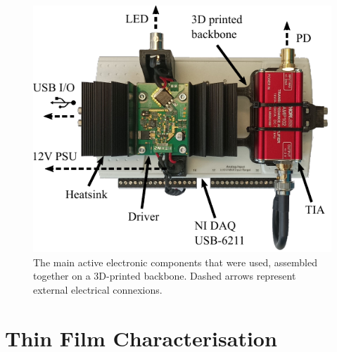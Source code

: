 \begin{figure}
	\centering
	\includegraphics{1_main_matter/thin_film_figures/optoelectronics/elec_setup_comp.pdf}
	\caption[Electronic setup.]{The main active electronic components that were used, assembled together on a 3D-printed backbone. Dashed arrows represent external electrical connexions.}
	\label{fig:thin_film:opto_elec:elec_setup}
\end{figure}

\section{Thin Film Characterisation}\label{sect:thin_film:results}

